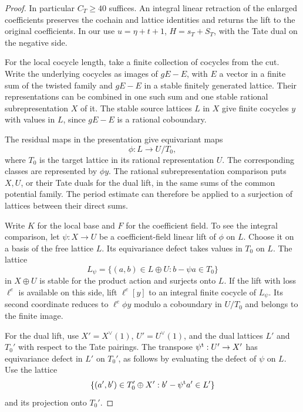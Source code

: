 \begin{proof}
In particular \(C_T\ge40\) suffices. An integral
linear retraction of the enlarged coefficients
preserves the cochain and lattice identities and
returns the lift to the original coefficients.
In our use \(u=\eta+t+1\), \(H=s_T+S_T\),
with the Tate dual on the negative side.
\label{cor:special-prime-lengths-3}

For the local cocycle length, take a finite
collection of cocycles from the cut. Write the
underlying cocycles as images of \(gE-E\), with \(E\)
a vector in a finite sum of the twisted family and
\(gE-E\) in a stable finitely generated lattice. Their
representations can be combined in one such sum
and one stable rational subrepresentation \(X\) of it.
The stable source lattices \(L\) in \(X\)
give finite cocycles \(y\) with values in \(L\),
since \(gE-E\) is a rational coboundary.

The residual maps in the presentation give equivariant
maps
\[
 \phi:L\to U/T_0,
\]
where \(T_0\) is the
target lattice in its rational representation \(U\).
The corresponding classes are represented by \(\phi y\).
The rational subrepresentation comparison puts \(X,U\),
or their Tate duals for the dual lift, in the same sums
of the common potential family. The period estimate
can therefore be applied to a surjection of lattices
between their direct sums.

Write \(K\) for the local base and \(F\) for the coefficient
field. To see the integral comparison, let \(\psi:X\to U\)
be a coefficient-field linear lift of \(\phi\) on \(L\).
Choose it on a basis of the free lattice \(L\). Its
equivariance defect takes values in \(T_0\) on \(L\).
The lattice
\[
 L_\psi=\{(a,b)\in L\oplus U:b-\psi a\in T_0\}
\]
in \(X\oplus U\) is stable for the product action and
surjects onto \(L\). If the lift with loss \(\ell^e\)
is available on this side, lift \(\ell^e[y]\) to an
integral finite cocycle of \(L_\psi\). Its second
coordinate reduces to \(\ell^e\phi y\) modulo a
coboundary in \(U/T_0\) and belongs to the finite image.

For the dual lift, use \(X'=X^\vee(1)\),
\(U'=U^\vee(1)\), and the dual lattices \(L'\) and \(T_0'\)
with respect to the Tate pairings. The transpose
\(\psi^{\rm t}:U'\to X'\) has equivariance defect in \(L'\)
on \(T_0'\), as follows by evaluating the defect of \(\psi\)
on \(L\). Use the lattice
\[
 \{(a',b')\in T_0'\oplus X':b'-\psi^{\rm t}a'\in L'\}
\]
and its projection onto \(T_0'\).


\end{proof}
